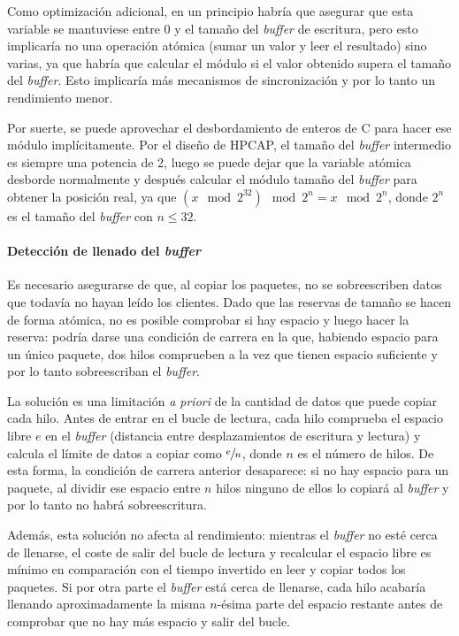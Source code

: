 \documentclass[twoside, 12pt, draft]{epstfg}
\begin{document}
Como optimización adicional, en un principio habría que asegurar que esta variable se mantuviese entre 0 y el tamaño del \textit{buffer} de escritura, pero esto implicaría no una operación atómica (sumar un valor y leer el resultado) sino varias, ya que habría que calcular el módulo si el valor obtenido supera el tamaño del \textit{buffer}. Esto implicaría más mecanismos de sincronización y por lo tanto un rendimiento menor.

Por suerte, se puede aprovechar el desbordamiento de enteros de C para hacer ese módulo implícitamente. Por el diseño de HPCAP, el tamaño del \textit{buffer} intermedio es siempre una potencia de 2, luego se puede dejar que la variable atómica desborde normalmente y después calcular el módulo tamaño del \textit{buffer} para obtener la posición real, ya que $(x \mod 2^{32}) \mod 2^n = x \mod 2^n$, donde $2^n$ es el tamaño del \textit{buffer} con $n ≤ 32$.

\paragraph{Detección de llenado del \textit{buffer}} Es necesario asegurarse de que, al copiar los paquetes, no se sobreescriben datos que todavía no hayan leído los clientes. Dado que las reservas de tamaño se hacen de forma atómica, no es posible comprobar si hay espacio y luego hacer la reserva: podría darse una condición de carrera en la que, habiendo espacio para un único paquete, dos hilos comprueben a la vez que tienen espacio suficiente y por lo tanto sobreescriban el \textit{buffer}.

La solución es una limitación \textit{a priori} de la cantidad de datos que puede copiar cada hilo. Antes de entrar en el bucle de lectura, cada hilo comprueba el espacio libre $e$ en el \textit{buffer} (distancia entre desplazamientos de escritura y lectura) y calcula el límite de datos a copiar como $\sfrac{e}{n}$, donde $n$ es el número de hilos. De esta forma, la condición de carrera anterior desaparece: si no hay espacio para un paquete, al dividir ese espacio entre $n$ hilos ninguno de ellos lo copiará al \textit{buffer} y por lo tanto no habrá sobreescritura.

Además, esta solución no afecta al rendimiento: mientras el \textit{buffer} no esté cerca de llenarse, el coste de salir del bucle de lectura y recalcular el espacio libre es mínimo en comparación con el tiempo invertido en leer y copiar todos los paquetes. Si por otra parte el \textit{buffer} está cerca de llenarse, cada hilo acabaría llenando aproximadamente la misma $n$-ésima parte del espacio restante antes de comprobar que no hay más espacio y salir del bucle.
\end{document}
